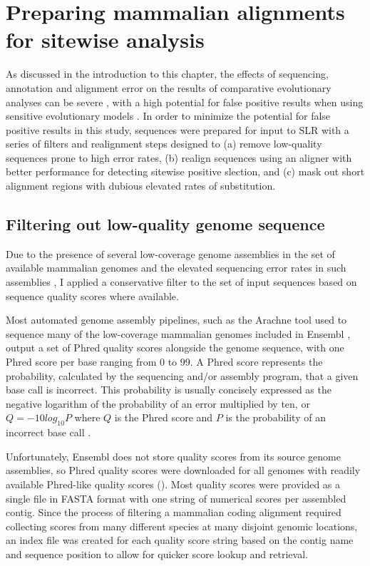 \section{Preparing mammalian alignments for sitewise analysis}

As discussed in the introduction to this chapter, the effects of
sequencing, annotation and alignment error on the results of
comparative evolutionary analyses can be severe \citep{TODO}, with a
high potential for false positive results when using sensitive
evolutionary models \citep{TODO}. In order to minimize the potential
for false positive results in this study, sequences were prepared for
input to SLR with a series of filters and realignment steps designed
to (a) remove low-quality sequences prone to high error rates, (b)
realign sequences using an aligner with better performance for
detecting sitewise positive slection, and (c) mask out short alignment
regions with dubious elevated rates of \nsyn substitution.

\subsection{Filtering out low-quality genome sequence}

Due to the presence of several low-coverage genome assemblies in the
set of available mammalian genomes and the elevated sequencing error
rates in such assemblies \citep{TODO, Ensembl 2x paper}, I applied a
conservative filter to the set of input sequences based on sequence
quality scores where available.

Most automated genome assembly pipelines, such as the Arachne tool
used to sequence many of the low-coverage mammalian genomes included
in Ensembl \citep{TODO, Arachne}, output a set of Phred quality scores
alongside the genome sequence, with one Phred score per base ranging
from 0 to 99. A Phred score represents the probability, calculated by
the sequencing and/or assembly program, that a given base call is
incorrect. This probability is usually concisely expressed as the
negative logarithm of the probability of an error multiplied by ten,
or $Q = -10log_{10}P$ where $Q$ is the Phred score and $P$ is the
probability of an incorrect base call \citep{TODO, Cock et al. 2010
  NAR}.

Unfortunately, Ensembl does not store quality scores from its source
genome assemblies, so Phred quality scores were downloaded for all
genomes with readily available Phred-like quality scores (). Most quality
scores were provided as a single file in FASTA format with one string
of numerical scores per assembled contig. Since the process of
filtering a mammalian coding alignment required collecting scores from
many different species at many disjoint genomic locations, an index
file was created for each quality score string based on the contig
name and sequence position to allow for quicker score lookup and
retrieval.

